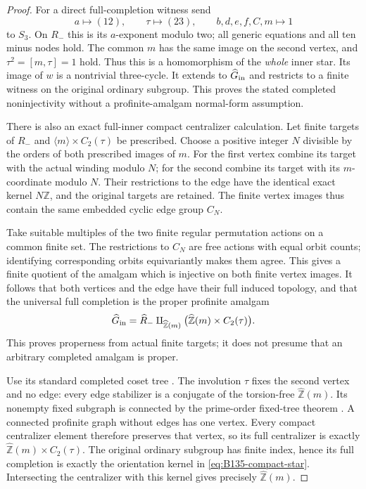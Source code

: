 \begin{proof}
For a direct full-completion witness send
\[
 a\longmapsto(12),\qquad\tau\longmapsto(23),\qquad
 b,d,e,f,C,m\longmapsto1
\]
to $S_3$. On $R_-$ this is its $a$-exponent modulo two;
all generic equations and all ten minus nodes hold. The
common $m$ has the same image on the second vertex, and
$\tau^2=[m,\tau]=1$ hold. Thus this is a homomorphism of
the \emph{whole} inner star. Its image of $w$ is a nontrivial
three-cycle. It extends to $\widehat G_{\rm in}$ and restricts
to a finite witness on the original ordinary subgroup.
This proves the stated completed noninjectivity without a
profinite-amalgam normal-form assumption.

There is also an exact full-inner compact centralizer calculation.
Let finite targets of $R_-$ and $\langle m\rangle\times C_2(\tau)$
be prescribed. Choose a positive integer $N$ divisible by the
orders of both prescribed images of $m$. For the first vertex
combine its target with the actual winding modulo $N$; for the
second combine its target with its $m$-coordinate modulo $N$.
Their restrictions to the edge have the identical exact kernel
$N\mathbb Z$, and the original targets are retained. The finite
vertex images thus contain the same embedded cyclic edge group
$C_N$.

Take suitable multiples of the two finite regular permutation
actions on a common finite set. The restrictions to $C_N$ are
free actions with equal orbit counts; identifying corresponding
orbits equivariantly makes them agree. This gives a finite
quotient of the amalgam which is injective on both finite vertex
images. It follows that both vertices and the edge have their
full induced topology, and that the universal full completion is
the proper profinite amalgam
\begin{equation}\label{eq:B135-compact-star}
 \widehat G_{\rm in}
   =\widehat R_-\amalg_{\widehat{\mathbb Z}(m)}
          \bigl(\widehat{\mathbb Z}(m)\times C_2(\tau)\bigr).
\end{equation}
This proves properness from actual finite targets; it does not
presume that an arbitrary completed amalgam is proper.

Use its standard completed coset tree
\citep[Proposition~3.8]{B_ZalesskiiMelnikov1989}.
The involution $\tau$ fixes the second vertex and no edge:
every edge stabilizer is a conjugate of the torsion-free
$\widehat{\mathbb Z}(m)$. Its nonempty fixed subgraph is connected
by the prime-order fixed-tree theorem
\citep[Theorem~2.8]{B_ZalesskiiMelnikov1989}.
A connected profinite graph without edges has one vertex.
Every compact centralizer element therefore preserves that vertex,
so its full centralizer is exactly
$\widehat{\mathbb Z}(m)\times C_2(\tau)$.
The original ordinary subgroup has finite index, hence its full
completion is exactly the orientation kernel in
\eqref{eq:B135-compact-star}. Intersecting the centralizer with
this kernel gives precisely $\widehat{\mathbb Z}(m)$.


\end{proof}
